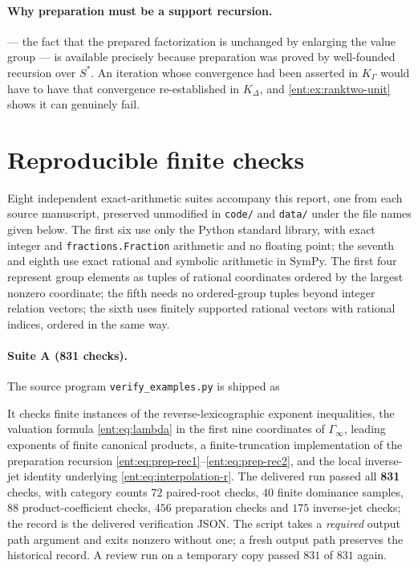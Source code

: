 \documentclass[11pt]{article}
\theoremstyle{plain}
\theoremstyle{plain}
\theoremstyle{plain}
\theoremstyle{definition}
\theoremstyle{definition}
\theoremstyle{definition}
\theoremstyle{definition}
\theoremstyle{remark}
\newcommand{\K}{K_\Gamma}\newcommand{\KD}{K_\Delta}
\begin{document}
\paragraph{Why preparation must be a support recursion.}
 --- the fact that the prepared factorization is
unchanged by enlarging the value group --- is available precisely because
preparation was proved by well-founded recursion over $S^*$. An iteration
whose convergence had been asserted in $\K$ would have to have that
convergence re-established in $\KD$, and \cref{ent:ex:ranktwo-unit} shows it
can genuinely fail.

\section{Reproducible finite checks}
\label{ent:app:checks}
Eight independent exact-arithmetic suites accompany this report, one from
each source manuscript, preserved unmodified in \texttt{code/} and
\texttt{data/} under the file names given below. The first six use only the
Python standard library, with exact integer and \texttt{fractions.Fraction}
arithmetic and no floating point; the seventh and eighth use exact rational
and symbolic arithmetic in SymPy. The first four represent group elements as
tuples of rational coordinates ordered by the largest nonzero coordinate;
the fifth needs no ordered-group tuples beyond integer relation vectors; the
sixth uses finitely supported rational vectors with rational indices, ordered
in the same way.

\paragraph{Suite A (831 checks).}
The source program \texttt{verify\_examples.py} is shipped as
\begin{quote}\small
{}
\end{quote}
It checks finite instances of the
reverse-lexicographic exponent inequalities, the valuation formula
\eqref{ent:eq:lambda} in the first nine coordinates of $\Gamma_\infty$,
leading exponents of finite canonical products, a finite-truncation
implementation of the preparation recursion
\eqref{ent:eq:prep-rec1}--\eqref{ent:eq:prep-rec2}, and the local inverse-jet
identity underlying \eqref{ent:eq:interpolation-r}. The delivered run passed
all \textbf{831} checks, with category counts $72$ paired-root checks, $40$
finite dominance samples, $88$ product-coefficient checks, $456$ preparation
checks and $175$ inverse-jet checks; the record is the delivered
verification JSON. The script takes a \emph{required} output path argument
and exits nonzero without one; a fresh output path preserves the historical
record. A review run on a temporary copy passed $831$ of $831$ again.
\end{document}
